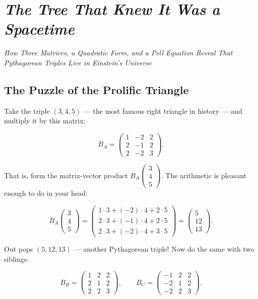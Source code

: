 \chapter{\textit{The Tree That Knew It Was a Spacetime}}
\begin{center}\large\itshape \textit{How Three Matrices, a Quadratic Form, and a Pell Equation Reveal That Pythagorean Triples Live in Einstein's Universe}\end{center}
\medskip
\label{ch05}




\bigskip


\section{The Puzzle of the Prolific Triangle}

Take the triple $(3, 4, 5)$ --- the most famous right triangle in history --- and multiply it by this matrix:

\[
B_A = \begin{pmatrix} 1 & -2 & 2 \\ 2 & -1 & 2 \\ 2 & -2 & 3 \end{pmatrix}.
\]

That is, form the matrix-vector product $B_A \begin{pmatrix} 3 \\ 4 \\ 5 \end{pmatrix}$. The arithmetic is pleasant enough to do in your head:

\[
B_A \begin{pmatrix} 3 \\ 4 \\ 5 \end{pmatrix} = \begin{pmatrix} 1\cdot3 + (-2)\cdot4 + 2\cdot5 \\ 2\cdot3 + (-1)\cdot4 + 2\cdot5 \\ 2\cdot3 + (-2)\cdot4 + 3\cdot5 \end{pmatrix} = \begin{pmatrix} 5 \\ 12 \\ 13 \end{pmatrix}.
\]

Out pops $(5, 12, 13)$ --- another Pythagorean triple! Now do the same with two siblings:

\[
B_B = \begin{pmatrix} 1 & 2 & 2 \\ 2 & 1 & 2 \\ 2 & 2 & 3 \end{pmatrix}, \qquad B_C = \begin{pmatrix} -1 & 2 & 2 \\ -2 & 1 & 2 \\ -2 & 2 & 3 \end{pmatrix}.
\]

